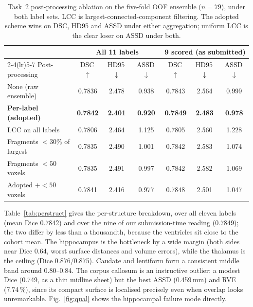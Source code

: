 \documentclass[runningheads]{llncs}
\begin{document}
\begin{table}[!htbp]
\caption{Task~2 post-processing ablation on the five-fold OOF ensemble ($n=79$), under
both label sets. LCC is largest-connected-component filtering. The adopted scheme wins
on DSC, HD95 and ASSD under either aggregation; uniform LCC is the clear loser on ASSD
under both.}
\label{tab:postproc}
\centering
\setlength{\tabcolsep}{3.5pt}
\footnotesize
\begin{tabular}{lcccccc}
\toprule
& \multicolumn{3}{c}{All 11 labels} & \multicolumn{3}{c}{9 scored (as submitted)} \\
\cmidrule(lr){2-4}\cmidrule(lr){5-7}
Post-processing & DSC\,$\uparrow$ & HD95\,$\downarrow$ & ASSD\,$\downarrow$
              & DSC\,$\uparrow$ & HD95\,$\downarrow$ & ASSD\,$\downarrow$ \\
\midrule
None (raw ensemble)            & 0.7836 & 2.478 & 0.938 & 0.7843 & 2.564 & 0.999 \\
\textbf{Per-label (adopted)}   & \textbf{0.7842} & \textbf{2.401} & \textbf{0.920}
  & \textbf{0.7849} & \textbf{2.483} & \textbf{0.978} \\
LCC on all labels              & 0.7806 & 2.464 & 1.125 & 0.7805 & 2.560 & 1.228 \\
Fragments $<30\%$ of largest   & 0.7835 & 2.490 & 1.001 & 0.7842 & 2.583 & 1.074 \\
Fragments $<50$ voxels         & 0.7835 & 2.491 & 0.997 & 0.7842 & 2.582 & 1.069 \\
Adopted $+<50$ voxels          & 0.7841 & 2.416 & 0.977 & 0.7848 & 2.501 & 1.047 \\
\bottomrule
\end{tabular}
\end{table}

Table~\ref{tab:perstruct} gives the per-structure breakdown, over all eleven
labels (mean Dice 0.7842) and over the nine of our submission-time reading (0.7849);
the two differ by less than a thousandth, because the ventricles sit close to the
cohort mean. The hippocampus is the bottleneck by a wide margin (both sides near Dice
0.64, worst surface distances and volume errors), while the thalamus is the ceiling
(Dice 0.876/0.875). Caudate and lentiform form a consistent middle band around
0.80--0.84. The corpus callosum is an instructive outlier: a modest Dice (0.749,
as a thin midline sheet) but the best ASSD (0.459\,mm) and RVE (7.74\,\%), since
its compact surface is localised precisely even when overlap looks unremarkable.
Fig.~\ref{fig:qual} shows the hippocampal failure mode directly.
\end{document}
